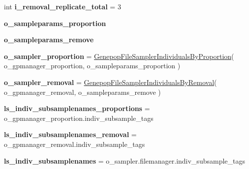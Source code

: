 \begin{DoxyCompactItemize}
\item 
int {\bfseries i\+\_\+removal\+\_\+replicate\+\_\+total} = 3\hypertarget{namespacenegui_1_1genepopfilesampler_af723f313525f06454616675e7875a54d}{}\label{namespacenegui_1_1genepopfilesampler_af723f313525f06454616675e7875a54d}

\item 
{\bfseries o\+\_\+sampleparams\+\_\+proportion}
\item 
{\bfseries o\+\_\+sampleparams\+\_\+remove}
\item 
{\bfseries o\+\_\+sampler\+\_\+proportion} = \hyperlink{classnegui_1_1genepopfilesampler_1_1GenepopFileSamplerIndividualsByProportion}{Genepop\+File\+Sampler\+Individuals\+By\+Proportion}( o\+\_\+gpmanager\+\_\+proportion, o\+\_\+sampleparams\+\_\+proportion )\hypertarget{namespacenegui_1_1genepopfilesampler_adea79648343141b6b058b5f8d540b13f}{}\label{namespacenegui_1_1genepopfilesampler_adea79648343141b6b058b5f8d540b13f}

\item 
{\bfseries o\+\_\+sampler\+\_\+removal} = \hyperlink{classnegui_1_1genepopfilesampler_1_1GenepopFileSamplerIndividualsByRemoval}{Genepop\+File\+Sampler\+Individuals\+By\+Removal}( o\+\_\+gpmanager\+\_\+removal, o\+\_\+sampleparams\+\_\+remove )\hypertarget{namespacenegui_1_1genepopfilesampler_ada52eabb224c1ef29331d394fc63ca7b}{}\label{namespacenegui_1_1genepopfilesampler_ada52eabb224c1ef29331d394fc63ca7b}

\item 
{\bfseries ls\+\_\+indiv\+\_\+subsamplenames\+\_\+proportions} = o\+\_\+gpmanager\+\_\+proportion.\+indiv\+\_\+subsample\+\_\+tags\hypertarget{namespacenegui_1_1genepopfilesampler_a23b5c9bd1eb574f409fd08f2df543d37}{}\label{namespacenegui_1_1genepopfilesampler_a23b5c9bd1eb574f409fd08f2df543d37}

\item 
{\bfseries ls\+\_\+indiv\+\_\+subsamplenames\+\_\+removal} = o\+\_\+gpmanager\+\_\+removal.\+indiv\+\_\+subsample\+\_\+tags\hypertarget{namespacenegui_1_1genepopfilesampler_aebfcea437386d84f1d520ecd19661282}{}\label{namespacenegui_1_1genepopfilesampler_aebfcea437386d84f1d520ecd19661282}

\item 
{\bfseries ls\+\_\+indiv\+\_\+subsamplenames} = o\+\_\+sampler.\+filemanager.\+indiv\+\_\+subsample\+\_\+tags\hypertarget{namespacenegui_1_1genepopfilesampler_a4c10016e82c552ee45f26c2d939cf994}{}\label{namespacenegui_1_1genepopfilesampler_a4c10016e82c552ee45f26c2d939cf994}


\end{DoxyCompactItemize}
